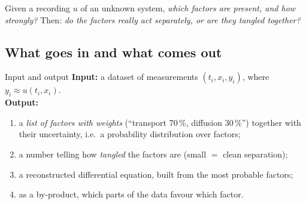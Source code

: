 \documentclass[11pt,a4paper]{article}
\begin{document}
\begin{ideabox}
Given a recording $u$ of an unknown system, \emph{which factors are present, and how strongly?} Then: \emph{do the factors really act separately, or are they tangled together?}
\end{ideabox}

\subsection*{What goes in and what comes out}
\begin{iobox}{Input and output}
\textbf{Input:} a dataset of measurements $(t_i,x_i,y_i)$, where $y_i\approx u(t_i,x_i)$.\\[2pt]
\textbf{Output:}
\begin{enumerate}[nosep,leftmargin=*]
\item a \emph{list of factors with weights} (``transport 70\,\%, diffusion 30\,\%'') together with their uncertainty, i.e.\ a probability distribution over factors;
\item a number telling how \emph{tangled} the factors are (small $=$ clean separation);
\item a reconstructed differential equation, built from the most probable factors;
\item as a by-product, which parts of the data favour which factor.
\end{enumerate}
\end{iobox}
\end{document}
